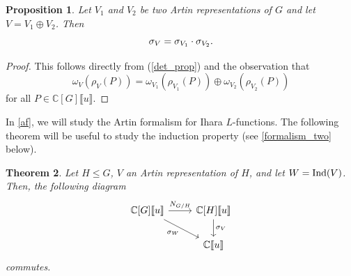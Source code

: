 \documentclass[11pt]{amsart}
\newtheorem{theorem}{Theorem}[section]
\newtheorem{proposition}[theorem]{Proposition}
\numberwithin{equation}{section}
\theoremstyle{remark}
\theoremstyle{definition}
\begin{document}
\begin{proposition} \label{mult_det}
Let $V_{1}$ and $V_{2}$ be two Artin representations of $G$ and let $V = V_{1} \oplus V_{2}$.  Then
$${\rm \sigma}_{V} = {\rm \sigma}_{V_{1}} \cdot {\rm \sigma}_{V_{2}}. $$
\end{proposition}
\begin{proof}
This follows directly from (\ref{det_prop}) and the observation that
$$\omega_{V}(\rho_{V}(P)) = \omega_{V_{1}}(\rho_{V_{1}}(P)) \oplus \omega_{V_{2}}(\rho_{V_{2}}(P)) $$
for all $P \in \mathbb{C}[G]\llbracket u \rrbracket$.
\end{proof}

In \cref{af}, we will study the Artin formalism for Ihara $L$-functions.  The following theorem will be useful to study the induction property (see \cref{formalism_two} below). 
\begin{theorem} \label{useful_for_induction}
Let $H \le G$, $V$ an Artin representation of $H$, and let $W = {\rm Ind}(V)$.  Then, the following diagram
\begin{equation*} 
\begin{tikzcd}
\mathbb{C}[G]\llbracket u \rrbracket \arrow["\sigma_{W}"',rd] \arrow["N_{G/H}",r] & \mathbb{C}[H]\llbracket u \rrbracket \arrow["\sigma_{V}",d] \\
 & \mathbb{C}\llbracket u \rrbracket  
\end{tikzcd}
\end{equation*}
commutes.
\end{theorem}
\end{document}
